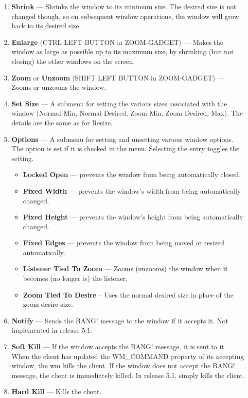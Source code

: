 \begin{enumerate}
\item {\bf Shrink} --- Shrinks the window to its minimum size.  The desired size
is not changed though, so on subsequent window operations, the window
will grow back to its desired size.

\item {\bf Enlarge} ({\sc CTRL LEFT BUTTON in ZOOM-GADGET}) --- Makes the window as
large as possible up to its maximum size, by shrinking (but not closing)
the other windows on the screen.

\item {\bf Zoom} or {\bf Unzoom} ({\sc SHIFT LEFT BUTTON in ZOOM-GADGET}) --- Zooms
or unzooms the window.

\item {\bf Set Size} --- A submenu for setting the various sizes associated with
the window (Normal Min, Normal Desired, Zoom Min, Zoom Desired,
Max).  The details are the same as for Resize.

\item 
{\bf Options} --- A submenu for setting and unsetting various window
options.  The option is set if it is checked in the menu.
Selecting the entry toggles the setting.

\begin{itemize}
\item {\bf Locked Open} --- prevents the window from being automatically closed.

\item {\bf Fixed Width} --- prevents the window's width from being automatically
changed.

\item {\bf Fixed Height} --- prevents the window's height from being
automatically changed.

\item {\bf Fixed Edges} --- prevents the window from being moved or resized
automatically.

\item {\bf Listener Tied To Zoom} --- Zooms (unzooms) the window when it becomes
(no longer is) the listener.

\item {\bf Zoom Tied To Desire} -- Uses the normal desired size in place
of the zoom desire size.

\end{itemize}


\item {\bf Notify} --- Sends the {\sc BANG!} message to the window if it accepts it.
Not implemented in release 5.1.

\item {\bf Soft Kill} ---  If the window accepts the {\sc BANG!} message, it is
sent to it.  When the client has updated the {\sc WM\_COMMAND}
property of its accepting window, the wm kills the client.
If the window does not accept the {\sc BANG!} message, the client is
immediately killed.  In release 5.1, simply kills the client.

\item {\bf Hard Kill} --- Kills the client.
\end{enumerate}

